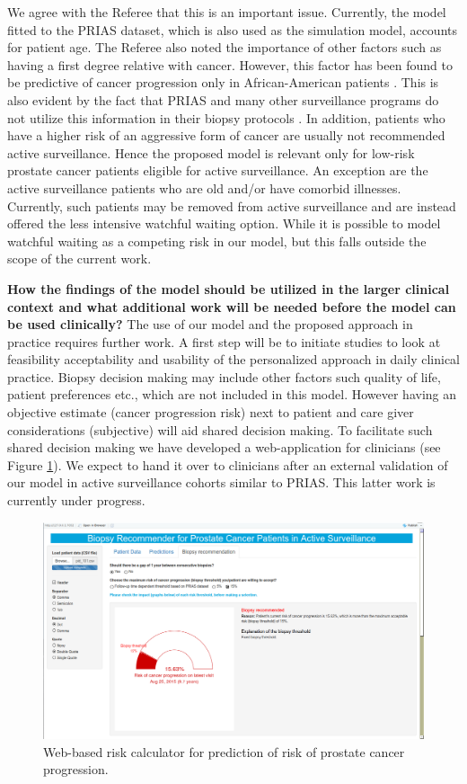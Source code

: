 \begin{enumerate}
    We agree with the Referee that this is an important issue. Currently, the model fitted to the PRIAS dataset, which is also used as the simulation model, accounts for patient age. The Referee also noted the importance of other factors such as having a first degree relative with cancer. However, this factor has been found to be predictive of cancer progression only in African-American patients \citep{telang2017prostate,goh2013clinical}. This is also evident by the fact that PRIAS and many other surveillance programs do not utilize this information in their biopsy protocols \citep{bokhorst2016decade,nieboer2018active}. In addition, patients who have a higher risk of an aggressive form of cancer are usually not recommended active surveillance. Hence the proposed model is relevant only for low-risk prostate cancer patients eligible for active surveillance. An exception are the active surveillance patients who are old and/or have comorbid illnesses. Currently, such patients may be removed from active surveillance and are instead offered the less intensive watchful waiting \citep{bokhorst2016decade} option. While it is possible to model watchful waiting as a competing risk in our model, but this falls outside the scope of the current work. 

    \textbf{How the findings of the model should be utilized in the larger clinical context and what additional work will be needed before the model can be used clinically?}
    The use of our model and the proposed approach in practice requires further work. A first step will be to initiate studies to look at feasibility acceptability and usability of the personalized approach in daily clinical practice. Biopsy decision making may include other factors such quality of life, patient preferences etc., which are not included in this model. However having an objective estimate (cancer progression risk) next to patient and care giver considerations (subjective) will aid shared decision making. To facilitate such shared decision making we have developed a web-application for clinicians (see Figure \ref{fig:webapp2}). We expect to hand it over to clinicians after an external validation of our model in active surveillance cohorts similar to PRIAS. This latter work is currently under progress.

    \begin{figure}[!htb]
	    		\centerline{\includegraphics[width=0.8\columnwidth]{../images/webapp.png}}
				\caption{Web-based risk calculator for prediction of risk of prostate cancer progression.}
				\label{fig:webapp2}
			\end{figure}
    
\end{enumerate}

